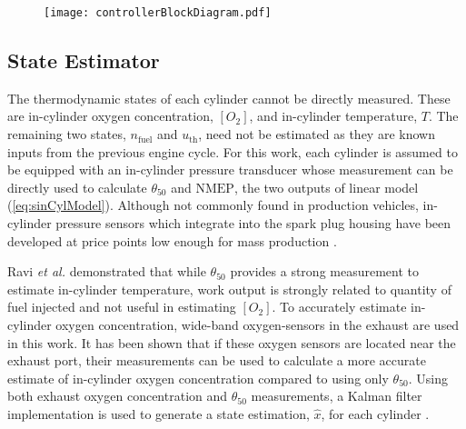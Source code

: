 \begin{figure}
\centering
\texttt{[image: controllerBlockDiagram.pdf]}
\caption{}
\label{fig:controller}
\end{figure}

\subsection{State Estimator}
\label{sec:stateEstimator}
The thermodynamic states of each cylinder cannot be directly measured. These are in-cylinder oxygen concentration, $[O_2]$, and in-cylinder temperature, $T$. The remaining two states, $n_{\mathrm{fuel}}$ and $u_{\mathrm{th}}$, need not be estimated as they are known inputs from the previous engine cycle. For this work, each cylinder is assumed to be equipped with an in-cylinder pressure transducer whose measurement can be directly used to calculate $\theta_{50}$ and $\mathrm{NMEP}$, the two outputs of linear model (\ref{eq:sinCylModel}). Although not commonly found in production vehicles, in-cylinder pressure sensors which integrate into the spark plug housing have been developed at price points low enough for mass production \cite{Sellnau2000}.

Ravi \textit{et al.} \cite{Ravi2012} demonstrated that while $\theta_{50}$ provides a strong measurement to estimate in-cylinder temperature, work output is strongly related to quantity of fuel injected and not useful in estimating $[O_2]$. To accurately estimate in-cylinder oxygen concentration, wide-band oxygen-sensors in the exhaust are used in this work. It has been shown that if these oxygen sensors are located near the exhaust port, their measurements can be used to calculate a more accurate estimate of in-cylinder oxygen concentration compared to using only $\theta_{50}$. Using both exhaust oxygen concentration and $\theta_{50}$ measurements, a Kalman filter implementation is used to generate a state estimation, $\hat x$, for each cylinder \cite{Ravi2012b}.

